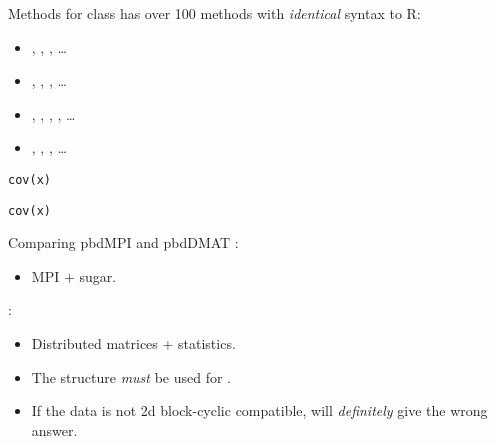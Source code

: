 \begin{frame}[fragile]
  \begin{block}{Methods for class }\pause
     has over 100 methods with \emph{identical} syntax to R:
    \begin{itemize}
     \item \code{\`{}[\`{}}, , , \dots
     \item {}, , , \dots
     \item \code{\`{}\%*\%\`{}}, , , , \dots
     \item {}, , , \dots
    \end{itemize}
\begin{lstlisting}[title=Serial Code]
cov(x)
\end{lstlisting}
  
\begin{lstlisting}[title=Parallel Code]
cov(x)
\end{lstlisting}
  \end{block}
\end{frame}

\begin{frame}[fragile]
  \begin{block}{Comparing pbdMPI and pbdDMAT}\pause
{}:
  \begin{itemize}
     \item MPI $+$ sugar.
     \end{itemize}
     
     :
     \begin{itemize}
     \item Distributed matrices + statistics.
     \item The  structure \emph{must} be used for .
     \item If the data is not 2d block-cyclic compatible,  will \emph{definitely} give the 
wrong 
answer.
    \end{itemize}
  \end{block}
\end{frame}
